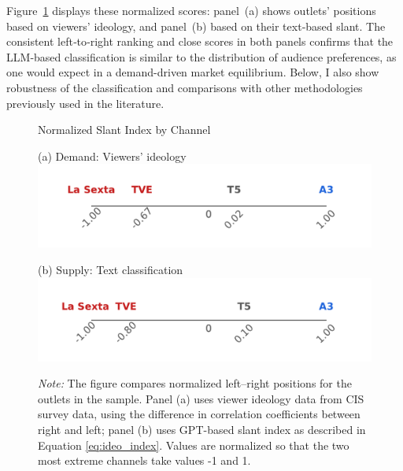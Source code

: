 \documentclass[12pt]{article}
\begin{document}
 
 
 
 Figure~\ref{fig:channel_ideology_lines} displays these normalized scores: panel~(a) shows outlets' positions based on viewers’ ideology, and panel~(b) based on their text‐based slant. The consistent left‐to‐right ranking and close scores in both panels confirms that the LLM‐based classification is similar to  the distribution of audience preferences, as one would expect in  a demand-driven market equilibrium. Below, I also show robustness of the classification and comparisons with other methodologies previously used in the literature.
		
	
	
		\begin{figure}[!htbp]
		\centering
		\caption{Normalized Slant Index by Channel}

		\begin{minipage}[t]{0.49\textwidth}
			\centering
					(a) Demand: Viewers' ideology
		\includegraphics[width=\linewidth]{figures/congress_line_cis}
		\end{minipage}
		\hfill
		\begin{minipage}[t]{0.49\textwidth}
			\centering

			
				(b) Supply: Text classification
			\includegraphics[width=\linewidth]{figures/congress_line_chatgpt}
			
			
		\end{minipage}
		
		
		\caption*{\small \textit{Note:} The figure compares normalized left–right positions for the outlets in the sample. Panel (a) uses viewer ideology data from CIS survey data, using the difference in correlation coefficients between right and left; panel (b) uses GPT-based slant index as described in Equation \eqref{eq:ideo_index}. Values are normalized so that the two most extreme channels take values -1 and 1. }
		\label{fig:channel_ideology_lines}
	\end{figure}
	
\end{document}
